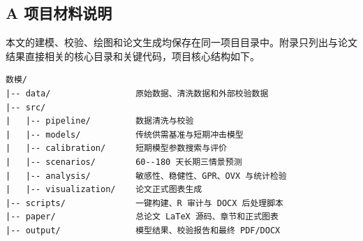 \subsection*{A 项目材料说明}

本文的建模、校验、绘图和论文生成均保存在同一项目目录中。附录只列出与论文结果直接相关的核心目录和关键代码，项目核心结构如下。

{\footnotesize
\begin{verbatim}
数模/
|-- data/                 原始数据、清洗数据和外部校验数据
|-- src/
|   |-- pipeline/         数据清洗与校验
|   |-- models/           传统供需基准与短期冲击模型
|   |-- calibration/      短期模型参数搜索与评价
|   |-- scenarios/        60--180 天长期三情景预测
|   |-- analysis/         敏感性、稳健性、GPR、OVX 与统计检验
|   |-- visualization/    论文正式图表生成
|-- scripts/              一键构建、R 审计与 DOCX 后处理脚本
|-- paper/                总论文 LaTeX 源码、章节和正式图表
|-- output/               模型结果、校验报告和最终 PDF/DOCX
\end{verbatim}
}
